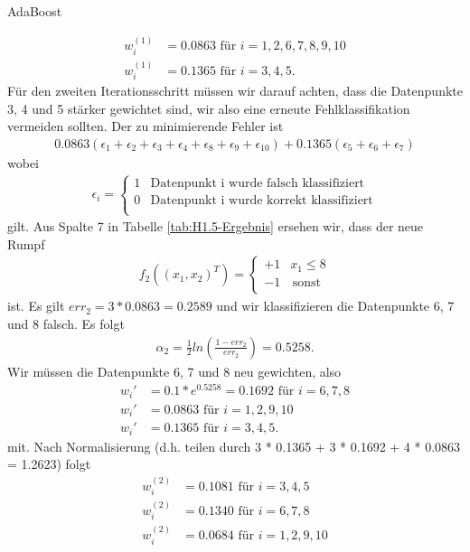 \begin{task}[credit=15]{AdaBoost}
\begin{subtask}[title=Algorithmus,points=12]
\begin{solution}
\begin{align*}
w_i^{(1)} &= 0.0863 \text{ für } i = 1,2,6,7,8,9,10 \\
w_i^{(1)} &= 0.1365 \text{ für } i = 3,4,5.
\end{align*} Für den zweiten Iterationsschritt müssen wir darauf achten, dass die Datenpunkte 3, 4 und 5 stärker gewichtet sind, wir also eine erneute Fehlklassifikation vermeiden sollten. Der zu minimierende Fehler ist \begin{align*}
0.0863(\epsilon_1 + \epsilon_2 +\epsilon_3 +\epsilon_4 +\epsilon_8 +\epsilon_9 +\epsilon_{10} ) + 0.1365(\epsilon_5 +\epsilon_6 +\epsilon_7)
\end{align*}wobei \begin{align*}
\epsilon_i = \left\{\begin{array}{ll}
1 & \text{Datenpunkt i wurde falsch klassifiziert} \\
0 & \text{Datenpunkt i wurde korrekt klassifiziert} \\
\end{array} 
\right.
\end{align*} gilt. Aus Spalte 7 in Tabelle \ref{tab:H1.5-Ergebnis} ersehen wir, dass der neue Rumpf \begin{align*}
f_2 ((x_1, x_2)^T) = \left\{
\begin{array}{ll}
+1 & x_1 \leq 8 \\
-1 & \, \textrm{sonst} \\
\end{array}
\right. 
\end{align*} ist. Es gilt $err_2 = 3 * 0.0863 = 0.2589$ und wir klassifizieren die Datenpunkte 6, 7 und 8 falsch. Es folgt \begin{align*}
\alpha_2 = \frac{1}{2}ln(\frac{1-err_2}{err_2}) = 0.5258.
\end{align*} Wir müssen die Datenpunkte 6, 7 und 8 neu gewichten, also \begin{align*}
w_i' &= 0.1 * e^{0.5258} = 0.1692 \text{ für } i = 6,7,8 \\
w_i' &= 0.0863 \text{ für } i = 1,2,9,10 \\
w_i' &= 0.1365 \text{ für } i = 3,4,5.
\end{align*} mit. Nach Normalisierung (d.h. teilen durch 3 * 0.1365 + 3 * 0.1692 + 4 * 0.0863 = 1.2623) folgt \begin{align*}
w_i^{(2)} &= 0.1081 \text{ für } i = 3,4,5 \\
w_i^{(2)} &= 0.1340 \text{ für } i = 6,7,8 \\
w_i^{(2)} &= 0.0684 \text{ für } i = 1,2,9,10 
\end{align*}


\end{solution}
\end{subtask}
\end{task}
